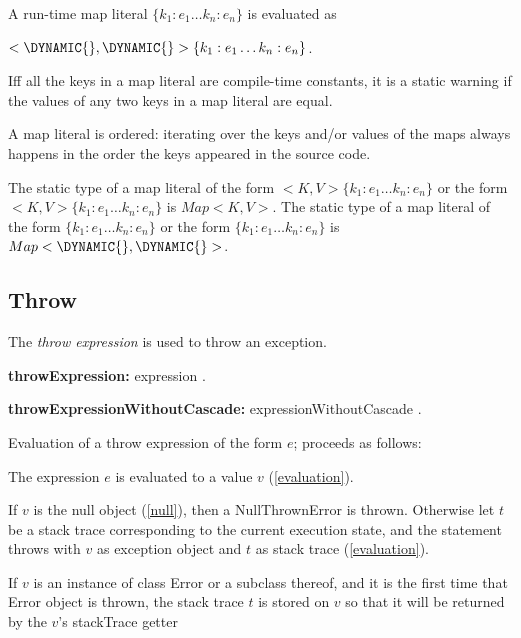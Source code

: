 \documentclass{article}
\newcommand{\code}[1]{{\sf #1}}
\begin{document}
\LMHash{}
A run-time map literal  $\{k_1:e_1\ldots k_n :e_n\}$ is evaluated as

$<\DYNAMIC{},  \DYNAMIC{}>\{k_1:e_1\ldots k_n :e_n\}$.

\LMHash{}
Iff all the keys in a map literal are compile-time constants, it is a static warning if the values of any two keys in a map literal are equal.

\LMHash{}
A map literal is ordered: iterating over the keys and/or values of the maps always happens in the
 order the keys appeared in the source code.


\LMHash{}
The static type of a map literal of the form \CONST{}$ <K, V>\{k_1:e_1\ldots k_n :e_n\}$ or the form $<K, V>\{k_1:e_1\ldots k_n :e_n\}$ is $Map<K, V>$.
The static type of a map literal of the form \CONST{}$\{k_1:e_1\ldots k_n :e_n\}$ or the form $\{k_1:e_1\ldots k_n :e_n\}$ is $Map<\DYNAMIC{}, \DYNAMIC{}>$.


\subsection{Throw}

\LMHash{}
The {\em throw expression}  is used to throw an exception.

 \begin{grammar}
{\bf throwExpression:}
     \THROW{} expression
    .

   {\bf throwExpressionWithoutCascade:}
     \THROW{} expressionWithoutCascade
    .

 \end{grammar}

\LMHash{}
Evaluation of a throw expression of the form  \code{\THROW{} $e$;} proceeds as follows:

\LMHash{}
The expression $e$ is evaluated to a value $v$ (\ref{evaluation}).


\LMHash{}
If $v$ is the null object (\ref{null}), then a \code{NullThrownError} is thrown.
Otherwise let $t$ be a stack trace corresponding to the current execution state,
and the \THROW{} statement throws with $v$ as exception object
and $t$ as stack trace (\ref{evaluation}).

\LMHash{}
If $v$ is an instance of class \code{Error} or a subclass thereof,
and it is the first time that \code{Error} object is thrown,
the stack trace $t$ is stored on $v$ so that it will be returned
by the $v$'s \code{stackTrace} getter
\end{document}
